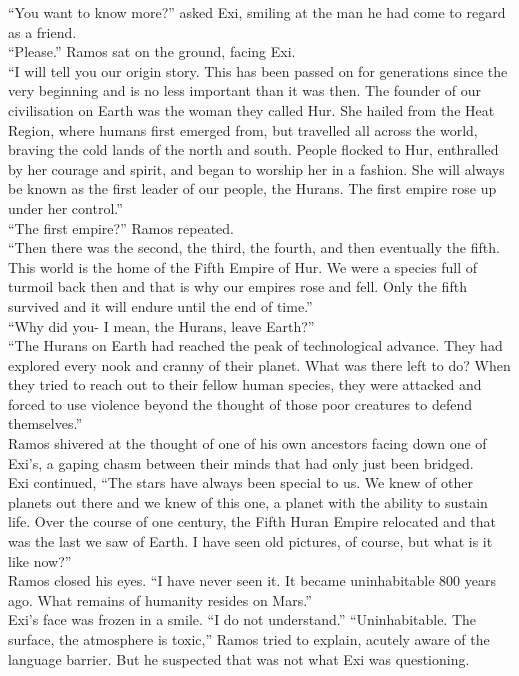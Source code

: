 “You want to know more?” asked Exi, smiling at the man he had come to regard as a friend.\\
“Please.” Ramos sat on the ground, facing Exi.\\
“I will tell you our origin story. This has been passed on for generations since the very beginning and is no less important than it was then. The founder of our civilisation on Earth was the woman they called Hur. She hailed from the Heat Region, where humans first emerged from, but travelled all across the world, braving the cold lands of the north and south. People flocked to Hur, enthralled by her courage and spirit, and  began to worship her in a fashion. She will always be known as the first leader of our people, the Hurans. The first empire rose up under her control.”\\
“The first empire?” Ramos repeated.\\
“Then there was the second, the third, the fourth, and then eventually the fifth. This world is the home of the Fifth Empire of Hur. We were a species full of turmoil back then and that is why our empires rose and fell. Only the fifth survived and it will endure until the end of time.”\\
“Why did you- I mean, the Hurans, leave Earth?”\\
“The Hurans on Earth had reached the peak of technological advance. They had explored every nook and cranny of their planet. What was there left to do? When they tried to reach out to their fellow human species, they were attacked and forced to use violence beyond the thought of those poor creatures to defend themselves.”\\
Ramos shivered at the thought of one of his own ancestors facing down one of Exi’s, a gaping chasm between their minds that had only just been bridged.\\
Exi continued, “The stars have always been special to us. We knew of other planets out there and we knew of this one, a planet with the ability to sustain life. Over the course of one century, the Fifth Huran Empire relocated and that was the last we saw of Earth. I have seen old pictures, of course, but what is it like now?”\\
Ramos closed his eyes. “I have never seen it. It became uninhabitable 800 years ago. What remains of humanity resides on Mars.”\\
Exi’s face was frozen in a smile. “I do not understand.”
“Uninhabitable. The surface, the atmosphere is toxic,” Ramos tried to explain, acutely aware of the language barrier. But he suspected that was not what Exi was questioning.

